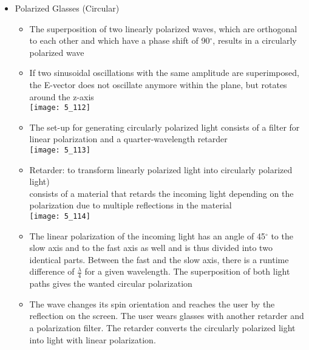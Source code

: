 \documentclass{standalone}
\begin{document}
\begin{itemize}
	\item Polarized Glasses (Circular)
	\begin{itemize}
		\item The superposition of two linearly polarized waves, which are orthogonal to each other and which have a phase shift of 90$^{\circ}$, results in a circularly polarized wave
		\item If two sinusoidal oscillations with the same amplitude are superimposed, the E-vector does not oscillate anymore within the plane, but rotates around the z-axis \\
		\texttt{[image: 5\_112]}
		\item The set-up for generating circularly polarized light consists of a filter for linear polarization and a quarter-wavelength retarder \\
		\texttt{[image: 5\_113]}
		\item Retarder: to transform linearly polarized light into circularly polarized light) \\
		consists of a material that retards the incoming light depending on the polarization due to multiple reflections in the material \\
		\texttt{[image: 5\_114]}
		\item The linear polarization of the incoming light has an angle of 45$^{\circ}$ to the slow axis and to the fast axis as well and is thus divided into two identical parts. Between the fast and the slow axis, there is a runtime difference of $\frac{\lambda}{4}$ for a given wavelength. The superposition of both light paths gives the wanted circular polarization
		\item The wave changes its spin orientation and reaches the user by the reflection on the screen. The
user wears glasses with another retarder and a polarization filter. The retarder converts the circularly polarized light into light with linear polarization.
	\end{itemize}
	

\end{itemize}
\end{document}

